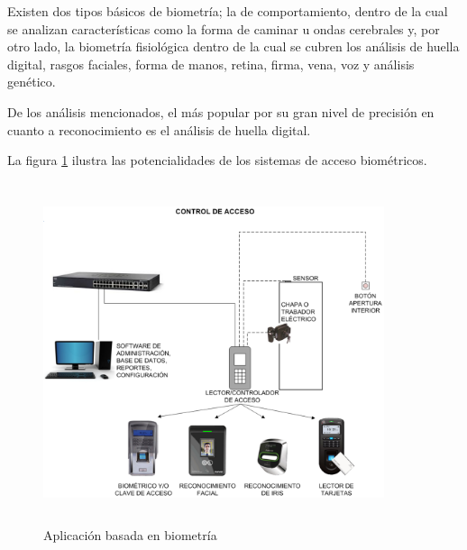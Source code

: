 Existen dos tipos básicos de biometría; la de comportamiento, dentro de la cual se analizan características como la forma de caminar u ondas cerebrales y, por otro lado, la biometría fisiológica dentro de la cual se cubren los análisis de huella digital, rasgos faciales, forma de manos, retina, firma, vena, voz y análisis genético.

De los análisis mencionados, el más popular por su gran nivel de precisión en cuanto a reconocimiento es el análisis de huella digital.  

La figura \ref{fig:sistemas_bio} ilustra las potencialidades de los sistemas de acceso biométricos.

\begin{figure}[H]
	\centering
	\includegraphics[height=10cm,width=10cm]{./Figures/sistemas_bio.pdf}
	\caption{Aplicación basada en biometría}
	\label{fig:sistemas_bio}
\end{figure}




